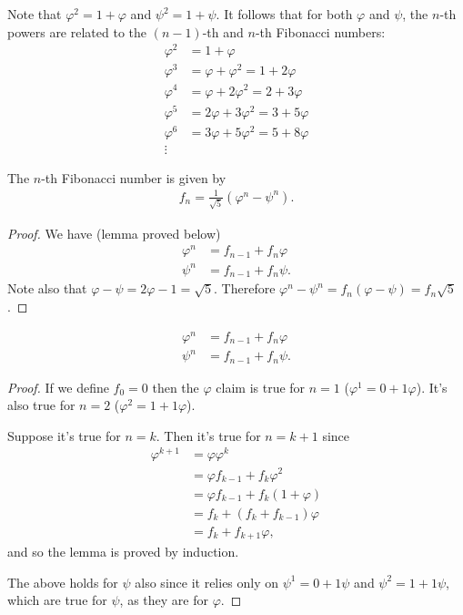 Note that $\varphi^2 = 1 + \varphi$ and $\psi^2 = 1 + \psi$. It follows that for both $\varphi$ and
$\psi$, the $n$-th powers are related to the $(n-1)$-th and $n$-th Fibonacci numbers:
  \begin{align*}
    \varphi^2  &= 1 + \varphi \\
    \varphi^3  &= \varphi + \varphi^2 = 1 + 2\varphi \\
    \varphi^4 &= \varphi + 2\varphi^2 = 2 + 3\varphi \\
    \varphi^5 &= 2\varphi + 3\varphi^2 = 3 + 5\varphi \\
    \varphi^6 &= 3\varphi + 5\varphi^2 = 5 + 8\varphi \\
    \vdots
  \end{align*}

\begin{claim}
  The $n$-th Fibonacci number is given by
  \begin{align*}
    f_n = \frac{1}{\sqrt5}(\varphi^n - \psi^n).
  \end{align*}
\end{claim}

\begin{proof}
  We have (lemma proved below)
\begin{align*}
  \varphi^n &= f_{n-1} + f_n\varphi \\
  \psi^n &= f_{n-1} + f_n\psi.
\end{align*}
  Note also that $\varphi - \psi = 2\varphi - 1 = \sqrt 5$. Therefore $\varphi^n - \psi^n = f_n(\varphi - \psi) = f_n\sqrt5$.
\end{proof}

\begin{lemma}
  \begin{align*}
  \varphi^n &= f_{n-1} + f_n\varphi \\
  \psi^n &= f_{n-1} + f_n\psi.
\end{align*}
\end{lemma}

\begin{proof}
  If we define $f_0 = 0$ then the $\varphi$ claim is true for $n=1$ ($\varphi^1 = 0 + 1\varphi$). It's also true for $n=2$ ($\varphi^2 = 1  + 1\varphi$).

  Suppose it's true for $n=k$. Then it's true for $n = k+1$ since
  \begin{align*}
    \varphi^{k+1} &= \varphi\varphi^k \\
            &= \varphi f_{k-1} + f_k\varphi^2 \\
            &=  \varphi f_{k-1} + f_k(1 + \varphi) \\
            &= f_k + (f_k + f_{k-1})\varphi \\
            &= f_k + f_{k+1}\varphi,
  \end{align*}
  and so the lemma is proved by induction.

  The above holds for $\psi$ also since it relies only on $\psi^1 = 0 + 1\psi$ and
  $\psi^2 = 1 + 1\psi$, which are true for $\psi$, as they are for $\varphi$.
\end{proof}


